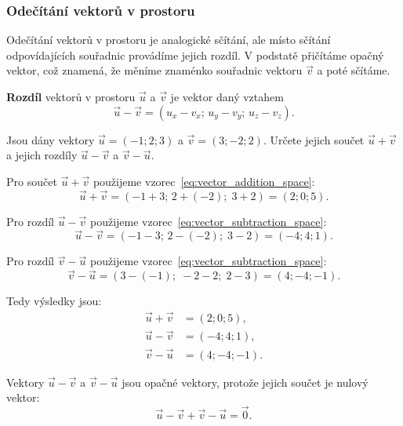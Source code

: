 \subsubsection{Odečítání vektorů v prostoru}\label{subsubsec:Vector_subtraction_in_space}
Odečítání vektorů v prostoru je analogické sčítání, ale místo sčítání odpovídajících souřadnic provádíme jejich rozdíl. 
V podstatě přičítáme opačný vektor, což znamená, že měníme znaménko souřadnic vektoru $\vec{v}$ a poté sčítáme.

\begin{definition}\label{def:vector_subtraction_space}
    \textbf{Rozdíl} vektorů v prostoru $\vec{u}$ a $\vec{v}$ je vektor daný vztahem
    \begin{equation}\label{eq:vector_subtraction_space}
        \vec{u} - \vec{v} = (u_x - v_x;\, u_y - v_y;\, u_z - v_z).
    \end{equation}
\end{definition}

\begin{example}
    Jsou dány vektory $\vec{u} = (-1;2;3)$ a $\vec{v} = (3;-2;2)$. Určete jejich součet $\vec{u} + \vec{v}$ a jejich rozdíly $\vec{u} - \vec{v}$ a $\vec{v} - \vec{u}$.

    Pro součet $\vec{u} + \vec{v}$ použijeme vzorec~\eqref{eq:vector_addition_space}:
    \[
    \vec{u} + \vec{v} = (-1 + 3;\, 2 + (-2);\; 3 + 2) = (2; 0; 5).
    \]

    Pro rozdíl $\vec{u} - \vec{v}$ použijeme vzorec~\eqref{eq:vector_subtraction_space}:
    \[
    \vec{u} - \vec{v} = (-1 - 3;\, 2 - (-2);\; 3 - 2) = (-4; 4; 1).
    \]

    Pro rozdíl $\vec{v} - \vec{u}$ použijeme vzorec~\eqref{eq:vector_subtraction_space}:
    \[
    \vec{v} - \vec{u} = (3 - (-1);\; -2 - 2;\; 2 - 3) = (4; -4; -1).
    \]

    Tedy výsledky jsou:
    \begin{align*}
        \vec{u} + \vec{v} &= (2; 0; 5),\\
        \vec{u} - \vec{v} &= (-4; 4; 1),\\
        \vec{v} - \vec{u} &= (4; -4; -1).
    \end{align*}


\end{example}

Vektory $\vec{u} - \vec{v}$ a $\vec{v} - \vec{u}$ jsou opačné vektory, protože jejich součet je nulový vektor:
\[
\vec{u} - \vec{v} + \vec{v} - \vec{u} = \vec{0}.
\]

